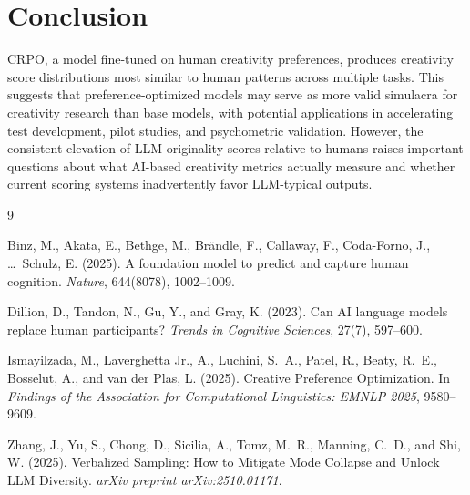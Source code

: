 \documentclass[11pt,twocolumn]{article}
\begin{document}
\section{Conclusion}

CRPO, a model fine-tuned on human creativity preferences, produces creativity score distributions most similar to human patterns across multiple tasks. This suggests that preference-optimized models may serve as more valid simulacra for creativity research than base models, with potential applications in accelerating test development, pilot studies, and psychometric validation. However, the consistent elevation of LLM originality scores relative to humans raises important questions about what AI-based creativity metrics actually measure and whether current scoring systems inadvertently favor LLM-typical outputs.


\begin{thebibliography}{9}

Binz, M., Akata, E., Bethge, M., Br\"{a}ndle, F., Callaway, F., Coda-Forno, J., \ldots\ Schulz, E. (2025).
\newblock A foundation model to predict and capture human cognition.
\newblock \emph{Nature}, 644(8078), 1002--1009.

Dillion, D., Tandon, N., Gu, Y., and Gray, K. (2023).
\newblock Can AI language models replace human participants?
\newblock \emph{Trends in Cognitive Sciences}, 27(7), 597--600.

Ismayilzada, M., Laverghetta Jr., A., Luchini, S.~A., Patel, R., Beaty, R.~E., Bosselut, A., and van der Plas, L. (2025).
\newblock Creative Preference Optimization.
\newblock In \emph{Findings of the Association for Computational Linguistics: EMNLP 2025}, 9580--9609.

Zhang, J., Yu, S., Chong, D., Sicilia, A., Tomz, M.~R., Manning, C.~D., and Shi, W. (2025).
\newblock Verbalized Sampling: How to Mitigate Mode Collapse and Unlock LLM Diversity.
\newblock \emph{arXiv preprint arXiv:2510.01171}.

\end{thebibliography}
\end{document}
